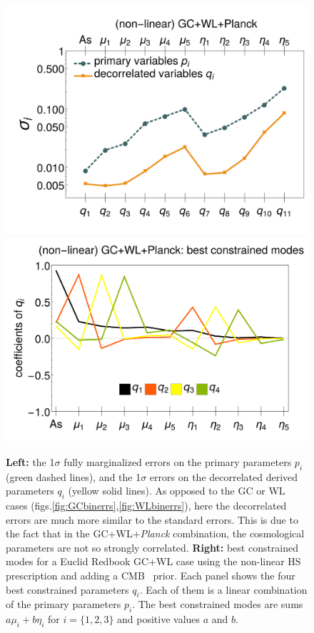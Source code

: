\begin{figure}[htbp]
	\centering
	\includegraphics[width=0.49\linewidth]{Chapters/linear-nonlinear-MG-forecasts/figures/Decorrelations-GC+WL+Planck/Errors_at_par_index_i--_ZCA_SquareNorm--fiducialMGBin3_Euclid_GC+WL+Planck_nonlinearPk__Zhao_}
	\includegraphics[width=0.49\linewidth]{Chapters/linear-nonlinear-MG-forecasts/figures/Decorrelations-GC+WL+Planck/non-linear_GC+WL+Planck--_best_constrained_modes-Errors_on_q_ZCA_SquareNorm--_fiducialMGBin3_Euclid_GC+WL+Planck_nonlinearPk__Zhao_}
	\caption[1$\sigma$ forecasted errors and best constrained modes for a Euclid GC+WL forecast.]{\label{fig:GC+WL+Planck-bestconst-errspq}
		\textbf{Left:} the 1$\sigma$ fully marginalized errors on the primary parameters $p_i$ (green dashed
		lines), and the 1$\sigma$ errors on the decorrelated derived
		parameters $q_i$ (yellow solid lines). As opposed to the GC or WL cases (figs.\ref{fig:GCbinerrs},\ref{fig:WLbinerrs}), here the decorrelated errors are much more similar to the standard errors.
		This is due to the fact that in the GC+WL+{\it Planck} combination, the cosmological parameters are not so strongly correlated.
		\textbf{Right:} best constrained modes for a Euclid Redbook GC+WL case using the non-linear HS prescription and adding a CMB \planck\ prior.
		Each panel shows the four best constrained parameters $q_i$. Each of them is a linear combination of the primary parameters $p_i$. 
		The best constrained modes are sums $a\mu_i + b\eta_i$ for $i=\{1,2,3\}$ and positive values $a$ and $b$.}
\end{figure}

